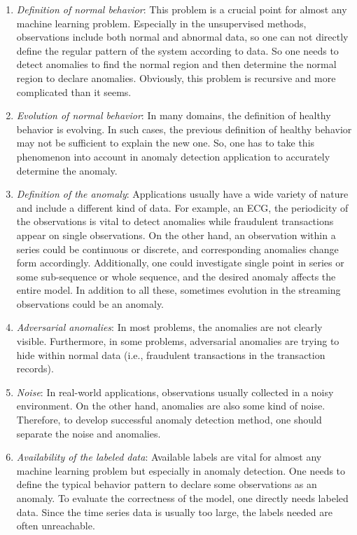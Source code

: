 \begin{enumerate}
    \item {\it Definition of normal behavior}: 
    This problem is a crucial point for almost any machine learning problem. 
    Especially in the unsupervised methods, observations include both normal and abnormal data, so one can not directly define the regular pattern of the system according to data. 
    So one needs to detect anomalies to find the normal region and then determine the normal region to declare anomalies. 
    Obviously, this problem is recursive and more complicated than it seems.
    
    \item {\it Evolution of normal behavior}: 
    In many domains, the definition of healthy behavior is evolving. 
    In such cases, the previous definition of healthy behavior may not be sufficient to explain the new one.
    So, one has to take this phenomenon into account in anomaly detection application to accurately determine the anomaly.
    
    \item {\it Definition of the anomaly}: 
    Applications usually have a wide variety of nature and include a different kind of data. For example, an ECG, the periodicity of the observations is vital to detect anomalies while fraudulent transactions appear on single observations.
    On the other hand, an observation within a series could be continuous or discrete, and corresponding anomalies change form accordingly. 
    Additionally, one could investigate single point in series or some sub-sequence or whole sequence, and the desired anomaly affects the entire model.
    In addition to all these, sometimes evolution in the streaming observations could be an anomaly. 
    
    \item {\it Adversarial anomalies}: 
    In most problems, the anomalies are not clearly visible. 
    Furthermore, in some problems, adversarial anomalies are trying to hide within normal data (i.e., fraudulent transactions in the transaction records). 
    
    \item {\it Noise}: 
    In real-world applications, observations usually collected in a noisy environment. 
    On the other hand, anomalies are also some kind of noise.
    Therefore, to develop successful anomaly detection method, one should separate the noise and anomalies. 

    \item {\it Availability of the labeled data}: 
    Available labels are vital for almost any machine learning problem but especially in anomaly detection. 
    One needs to define the typical behavior pattern to declare some observations as an anomaly. 
    To evaluate the correctness of the model, one directly needs labeled data.
    Since the time series data is usually too large, the labels needed are often unreachable.
    

\end{enumerate}
